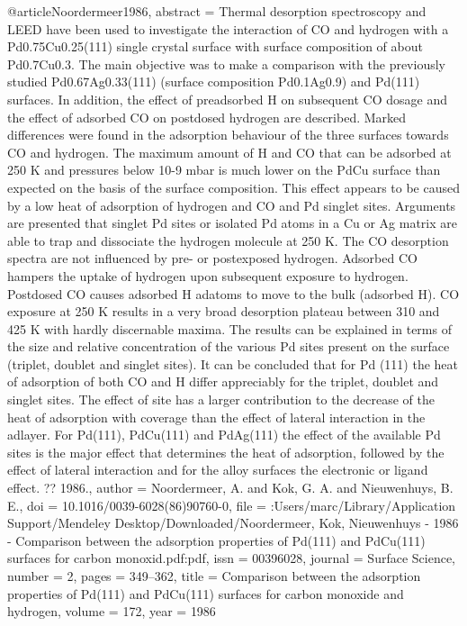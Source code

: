 @article{Noordermeer1986,
abstract = {Thermal desorption spectroscopy and LEED have been used to investigate the interaction of CO and hydrogen with a Pd0.75Cu0.25(111) single crystal surface with surface composition of about Pd0.7Cu0.3. The main objective was to make a comparison with the previously studied Pd0.67Ag0.33(111) (surface composition Pd0.1Ag0.9) and Pd(111) surfaces. In addition, the effect of preadsorbed H on subsequent CO dosage and the effect of adsorbed CO on postdosed hydrogen are described. Marked differences were found in the adsorption behaviour of the three surfaces towards CO and hydrogen. The maximum amount of H and CO that can be adsorbed at 250 K and pressures below 10-9 mbar is much lower on the PdCu surface than expected on the basis of the surface composition. This effect appears to be caused by a low heat of adsorption of hydrogen and CO and Pd singlet sites. Arguments are presented that singlet Pd sites or isolated Pd atoms in a Cu or Ag matrix are able to trap and dissociate the hydrogen molecule at 250 K. The CO desorption spectra are not influenced by pre- or postexposed hydrogen. Adsorbed CO hampers the uptake of hydrogen upon subsequent exposure to hydrogen. Postdosed CO causes adsorbed H adatoms to move to the bulk (adsorbed H). CO exposure at 250 K results in a very broad desorption plateau between 310 and 425 K with hardly discernable maxima. The results can be explained in terms of the size and relative concentration of the various Pd sites present on the surface (triplet, doublet and singlet sites). It can be concluded that for Pd (111) the heat of adsorption of both CO and H differ appreciably for the triplet, doublet and singlet sites. The effect of site has a larger contribution to the decrease of the heat of adsorption with coverage than the effect of lateral interaction in the adlayer. For Pd(111), PdCu(111) and PdAg(111) the effect of the available Pd sites is the major effect that determines the heat of adsorption, followed by the effect of lateral interaction and for the alloy surfaces the electronic or ligand effect. ?? 1986.},
author = {Noordermeer, A. and Kok, G. A. and Nieuwenhuys, B. E.},
doi = {10.1016/0039-6028(86)90760-0},
file = {:Users/marc/Library/Application Support/Mendeley Desktop/Downloaded/Noordermeer, Kok, Nieuwenhuys - 1986 - Comparison between the adsorption properties of Pd(111) and PdCu(111) surfaces for carbon monoxid.pdf:pdf},
issn = {00396028},
journal = {Surface Science},
number = {2},
pages = {349--362},
title = {{Comparison between the adsorption properties of Pd(111) and PdCu(111) surfaces for carbon monoxide and hydrogen}},
volume = {172},
year = {1986}
}
